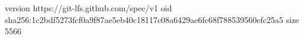 version https://git-lfs.github.com/spec/v1
oid sha256:1c2bdf5273fcf0a9f87ae5eb40c18117c08a6429ae6fc68f788539560efc25a5
size 5566
